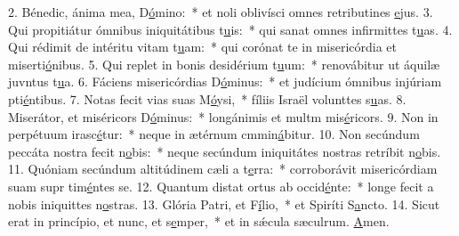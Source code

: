 2. Bénedic, ánima mea, D\uline{ó}mino:~* et noli oblivísci omnes retributines \uline{e}jus.
3. Qui propitiátur ómnibus iniquitátibus t\uline{u}is:~* qui sanat omnes infirmittes t\uline{u}as.
4. Qui rédimit de intéritu vitam t\uline{u}am:~* qui corónat te in misericórdia et miserti\uline{ó}nibus.
5. Qui replet in bonis desidérium t\uline{u}um:~* renovábitur ut áquilæ juvntus t\uline{u}a.
6. Fáciens misericórdias D\uline{ó}minus:~* et judícium ómnibus injúriam pti\uline{é}ntibus.
7. Notas fecit vias suas M\uline{ó}ysi,~* fíliis Israël volunttes s\uline{u}as.
8. Miserátor, et miséricors D\uline{ó}minus:~* longánimis et multm mis\uline{é}ricors.
9. Non in perpétuum irasc\uline{é}tur:~* neque in ætérnum cmmin\uline{á}bitur.
10. Non secúndum peccáta nostra fecit n\uline{o}bis:~* neque secúndum iniquitátes nostras retríbit n\uline{o}bis.
11. Quóniam secúndum altitúdinem cæli a t\uline{e}rra:~* corroborávit misericórdiam suam supr tim\uline{é}ntes se.
12. Quantum distat ortus ab occid\uline{é}nte:~* longe fecit a nobis iniquittes n\uline{o}stras.
13. Glória Patri, et F\uline{í}lio,~* et Spiríti S\uline{a}ncto.
14. Sicut erat in princípio, et nunc, et s\uline{e}mper,~* et in sǽcula sæculrum. \uline{A}men.
